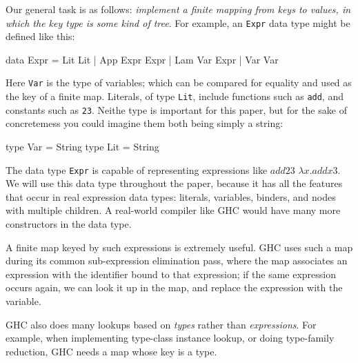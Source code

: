 \documentclass[format=sigplan]{acmart}
\theoremstyle{theorem}
\theoremstyle{definition}
\theoremstyle{remark}
\begin{document}
Our general task is as follows: \emph{implement a finite mapping from keys to values,
in which the key type is some kind of tree}.
For example, an \lstinline{Expr} data type might be defined like this:
\begin{code}
  data Expr = Lit Lit
            | App Expr Expr
            | Lam  Var Expr
            | Var Var
\end{code}
Here \lstinline{Var} is the type of variables; which can be compared for
equality and used as the key of a finite map.  Literals, of type \lstinline{Lit},
include functions such as \lstinline{add}, and constants such as \lstinline{23}.
Neithe type is important for this paper, but for the sake of concretemess
you could imagine them both being simply a string:
\begin{code}
  type Var = String
  type Lit = String
\end{code}
The data type \lstinline{Expr} is capable of representing expressions like $add 2 3$
$\lambda x. add x 3$.  We will use this data type throughout the paper, because it
has all the features that occur in real expression data types: literals, variables,
binders, and nodes with multiple children.  A real-world compiler like GHC would have
many more constructors in the data type.

A finite map keyed by such expressions is extremely useful.
GHC uses such a map during its common sub-expression
elimination pass, where the map associates an
expression with the identifier bound to that expression; if the same
expression occurs again, we can look it up in the map, and replace the
expression with the variable.

GHC also does many lookups based on \emph{types} rather than
\emph{expressions}.  For example, when implementing type-class
instance lookup, or doing type-family reduction, GHC needs a map whose
key is a type.
\end{document}
